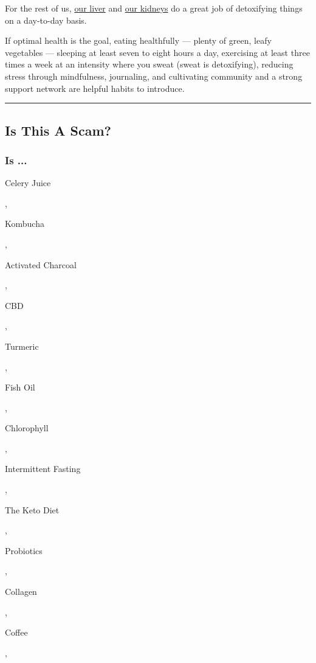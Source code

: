 For the rest of us,
\href{https://www.mayoclinic.org/diseases-conditions/liver-problems/symptoms-causes/syc-20374502}{our
liver} and
\href{https://www.mayoclinic.org/diseases-conditions/chronic-kidney-disease/diagnosis-treatment/drc-20354527}{our
kidneys} do a great job of detoxifying things on a day-to-day basis.

If optimal health is the goal, eating healthfully --- plenty of green,
leafy vegetables --- sleeping at least seven to eight hours a day,
exercising at least three times a week at an intensity where you sweat
(sweat is detoxifying), reducing stress through mindfulness, journaling,
and cultivating community and a strong support network are helpful
habits to introduce.

\begin{center}\rule{0.5\linewidth}{\linethickness}\end{center}

\hypertarget{is-this-a-scam}{%
\subsection{Is This A Scam?}\label{is-this-a-scam}}

\hypertarget{is-}{%
\subsubsection{Is ...}\label{is-}}

Celery Juice

,

Kombucha

,

Activated Charcoal

,

CBD

,

Turmeric

,

Fish Oil

,

Chlorophyll

,

Intermittent Fasting

,

The Keto Diet

,

Probiotics

,

Collagen

,

Coffee

,

